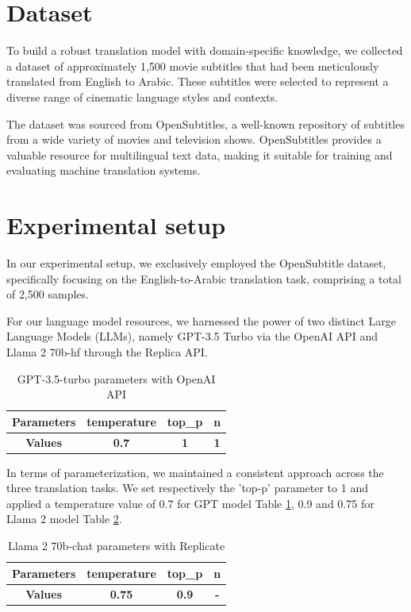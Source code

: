 \documentclass[twocolumn]{article}
\begin{document}
\section{Dataset}
To build a robust translation model with domain-specific knowledge, we collected a dataset of approximately 1,500 movie subtitles that had been meticulously translated from English to Arabic. These subtitles were selected to represent a diverse range of cinematic language styles and contexts. 

The dataset was sourced from OpenSubtitles\cite{lison2016opensubtitles2016}, a well-known repository of subtitles
from a wide variety of movies and television shows. OpenSubtitles provides a valuable
resource for multilingual text data, making it suitable for training and evaluating
machine translation systems.


\section{Experimental setup}
In our experimental setup, we exclusively employed the OpenSubtitle dataset, specifically focusing on the English-to-Arabic translation task, comprising a total of 2,500 samples.

For our language model resources, we harnessed the power of two distinct Large Language Models (LLMs), namely GPT-3.5 Turbo via the OpenAI API and Llama 2 70b-hf through the Replica API.


\begin{table}[h]
	\centering
	\begin{tabular}{|c|c|c|c|}
		\hline
		\textbf{Parameters}  & \textbf{temperature} & \textbf{top\_p} & \textbf{n}\\
		\hline
		\textbf{Values}  & \textbf{0.7}  & \textbf{1}  & \textbf{1}\\
		\hline
	\end{tabular}
	\caption{GPT-3.5-turbo parameters with OpenAI API}
	\label{table:GPT_3.5_turbo_parameters_with_OpenAI_API}
\end{table}

In terms of parameterization, we maintained a consistent approach across the three translation tasks. We set respectively the 'top-p' parameter to 1  and applied a temperature value of 0.7 for GPT model Table \ref{table:GPT_3.5_turbo_parameters_with_OpenAI_API},  0.9 and 0.75 for Llama 2 model Table \ref{table:Llama_2_70b_chat_parameters}. 


\begin{table}[h]
	\centering
	\begin{tabular}{|c|c|c|c|}

		\hline
		\textbf{Parameters} & \textbf{temperature} & \textbf{top\_p} & \textbf{n}\\
		\hline
		\textbf{Values}  & \textbf{0.75}  & \textbf{0.9}  & \textbf{-}\\
		\hline
	\end{tabular}
	\caption{Llama 2 70b-chat parameters with Replicate}
	\label{table:Llama_2_70b_chat_parameters}
\end{table}
\end{document}

